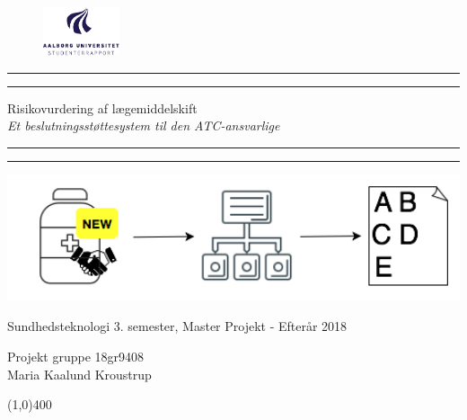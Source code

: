 \clearpage
\thispagestyle{empty}

\begin{figure}[H]
	\raggedleft
	\includegraphics[width=0.2\textwidth]{billeder/aau_logo_da.pdf}
\end{figure} 

\begin{center}	
	\rule{\textwidth}{1.6pt}\vspace*{-\baselineskip}\vspace*{2pt} %
	\rule{\textwidth}{0.4pt} %
	
	\vspace{0.75\baselineskip} %
	
	{\Huge Risikovurdering af lægemiddelskift} \\ \vspace{3mm}%
	{\Large\textit{Et beslutningsstøttesystem til den ATC-ansvarlige}}
	\vspace{0.75\baselineskip} %
	
	\rule{\textwidth}{0.4pt}\vspace*{-\baselineskip}\vspace{3.2pt} %
	\rule{\textwidth}{1.6pt} %
	
	\vspace{3.5\baselineskip} %
		\includegraphics[width=1\textwidth]{Statusseminar/statusforside.png} \\
		\vspace{3cm}
	 		\begin{Large}
	 		Sundhedsteknologi 3. semester, Master Projekt - Efterår 2018\\
		\vspace{1cm}
			\end{Large}
	{\large Projekt gruppe 18gr9408 \\
	Maria Kaalund Kroustrup}
\end{center}
\vspace*{\fill}

\begin{center}
	\line(1,0){400}
\end{center}



